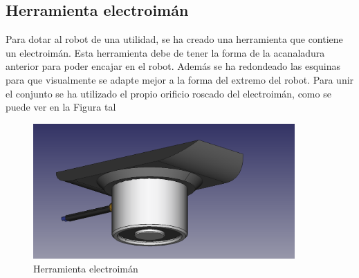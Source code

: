 \subsection{Herramienta electroimán}
\noindent Para dotar al robot de una utilidad, se ha creado una herramienta que contiene un electroimán. Esta herramienta debe de tener la forma 
de la acanaladura anterior para poder encajar en el robot. Además se ha redondeado las esquinas para que visualmente se adapte mejor a la 
forma del extremo del robot. Para unir el conjunto se ha utilizado el propio orificio roscado del electroimán, como se puede ver en la Figura tal
\begin{figure} [ht!]
  \begin{center}
    \includegraphics[width=10cm]{figs/electroiman_solo.png}
  \end{center}
  \caption{Herramienta electroimán}
\end{figure}\ 


